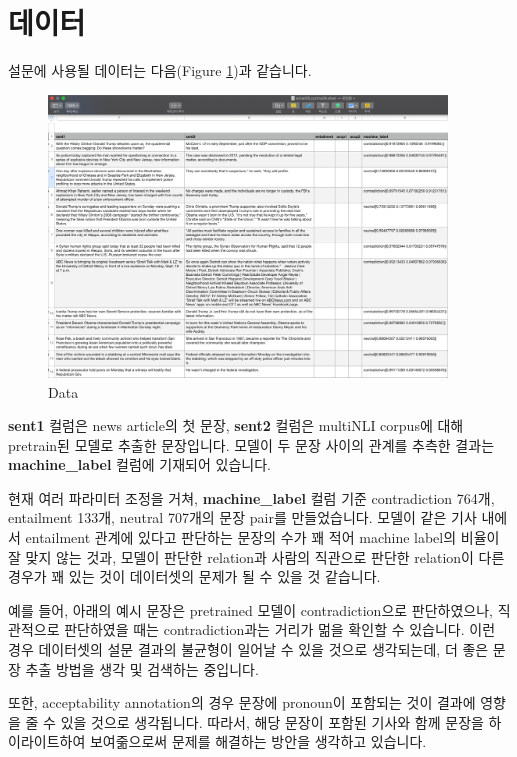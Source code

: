 \documentclass[11pt]{article}
\begin{document}
\section{데이터}
설문에 사용될 데이터는 다음(Figure \ref{fig:data})과 같습니다.
\begin{figure}[!htbp]
  \centering
  \includegraphics[width=400px]{images/amt-03.png}
  \caption{Data}
  \label{fig:data}
\end{figure}
\textbf{sent1} 컬럼은 news article의 첫 문장,
\textbf{sent2} 컬럼은 multiNLI corpus에 대해 pretrain된 모델로 추출한 문장입니다.
모델이 두 문장 사이의 관계를 추측한 결과는 \textbf{machine\_label} 컬럼에 기재되어 있습니다.

현재 여러 파라미터 조정을 거쳐, \textbf{machine\_label} 컬럼 기준
contradiction 764개, entailment 133개, neutral 707개의 문장 pair를 만들었습니다.
모델이 같은 기사 내에서 entailment 관계에 있다고 판단하는 문장의 수가 꽤 적어 machine label의 비율이 잘 맞지 않는 것과,
모델이 판단한 relation과 사람의 직관으로 판단한 relation이 다른 경우가 꽤 있는 것이 데이터셋의 문제가 될 수 있을 것 같습니다.

예를 들어, 아래의 예시 문장은 pretrained 모델이 contradiction으로 판단하였으나,
직관적으로 판단하였을 때는 contradiction과는 거리가 멂을 확인할 수 있습니다.
이런 경우 데이터셋의 설문 결과의 불균형이 일어날 수 있을 것으로 생각되는데, 더 좋은 문장 추출 방법을 생각 및 검색하는 중입니다.
\noindent
\begin{center}
\end{center}

또한, acceptability annotation의 경우 문장에 pronoun이 포함되는 것이 결과에 영향을 줄 수 있을 것으로 생각됩니다.
따라서, 해당 문장이 포함된 기사와 함께 문장을 하이라이트하여 보여줆으로써 문제를 해결하는 방안을 생각하고 있습니다.
\end{document}

